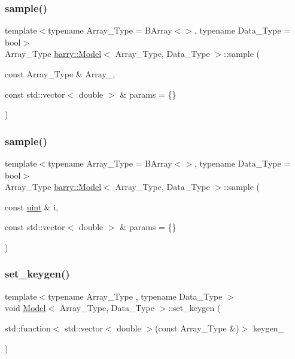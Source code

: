 \subsubsection{\texorpdfstring{sample()}{sample()}\hspace{0.1cm}{\footnotesize\ttfamily [1/2]}}
{\footnotesize\ttfamily template$<$typename Array\+\_\+\+Type  = B\+Array$<$$>$, typename Data\+\_\+\+Type  = bool$>$ \\
Array\+\_\+\+Type \hyperlink{classbarry_1_1_model}{barry\+::\+Model}$<$ Array\+\_\+\+Type, Data\+\_\+\+Type $>$\+::sample (\begin{DoxyParamCaption}\item[{const Array\+\_\+\+Type \&}]{Array\+\_\+,  }\item[{const std\+::vector$<$ double $>$ \&}]{params = {\ttfamily \{\}} }\end{DoxyParamCaption})}

\mbox{\label{classbarry_1_1_model_a7f694a828e10372f94d856452dde7610}} 
\subsubsection{\texorpdfstring{sample()}{sample()}\hspace{0.1cm}{\footnotesize\ttfamily [2/2]}}
{\footnotesize\ttfamily template$<$typename Array\+\_\+\+Type  = B\+Array$<$$>$, typename Data\+\_\+\+Type  = bool$>$ \\
Array\+\_\+\+Type \hyperlink{classbarry_1_1_model}{barry\+::\+Model}$<$ Array\+\_\+\+Type, Data\+\_\+\+Type $>$\+::sample (\begin{DoxyParamCaption}\item[{const \hyperlink{namespacebarry_a11dfc53ddb4672278319aa04f1e09a6c}{uint} \&}]{i,  }\item[{const std\+::vector$<$ double $>$ \&}]{params = {\ttfamily \{\}} }\end{DoxyParamCaption})}

\mbox{\label{classbarry_1_1_model_afa4736153fa419e1f141839eda735dfe}} 
\subsubsection{\texorpdfstring{set\+\_\+keygen()}{set\_keygen()}}
{\footnotesize\ttfamily template$<$typename Array\+\_\+\+Type , typename Data\+\_\+\+Type $>$ \\
void \hyperlink{classbarry_1_1_model}{Model}$<$ Array\+\_\+\+Type, Data\+\_\+\+Type $>$\+::set\+\_\+keygen (\begin{DoxyParamCaption}\item[{std\+::function$<$ std\+::vector$<$ double $>$(const Array\+\_\+\+Type \&)$>$}]{keygen\+\_\+ }\end{DoxyParamCaption})\hspace{0.3cm}{\ttfamily [inline]}}



